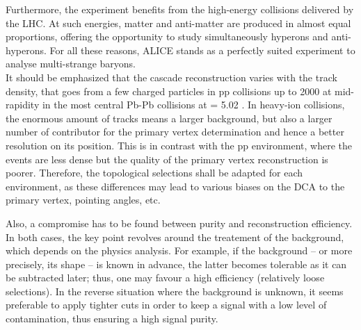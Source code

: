 Furthermore, the experiment benefits from the high-energy collisions delivered by the LHC. At such energies, matter and anti-matter are produced in almost equal proportions, offering the opportunity to study simultaneously hyperons and anti-hyperons. For all these reasons, ALICE stands as a perfectly suited experiment to analyse multi-strange baryons. \\

It should be emphasized that the cascade reconstruction varies with the track density, that goes from a few charged particles in pp collisions up to 2000 at mid-rapidity in the most central Pb-Pb collisions at \sqrtSnn = 5.02 \tev \cite{alicecollaborationCentralityDependenceChargedParticle2016}. In heavy-ion collisions, the enormous amount of tracks means a larger background, but also a larger number of contributor for the primary vertex determination and hence a better resolution on its position. This is in contrast with the pp environment, where the events are less dense but the quality of the primary vertex reconstruction is poorer. Therefore, the topological selections shall be adapted for each environment, as these differences may lead to various biases on the DCA to the primary vertex, pointing angles, etc.

Also, a compromise has to be found between purity and reconstruction efficiency. In both cases, the key point revolves around the treatement of the background, which depends on the physics analysis. For example, if the background -- or more precisely, its shape -- is known in advance, the latter becomes tolerable as it can be subtracted later; thus, one may favour a high efficiency (\ie relatively loose selections). In the reverse situation  where the background is unknown, it seems preferable to apply tighter cuts in order to keep a signal with a low level of contamination, thus ensuring a high signal purity.

